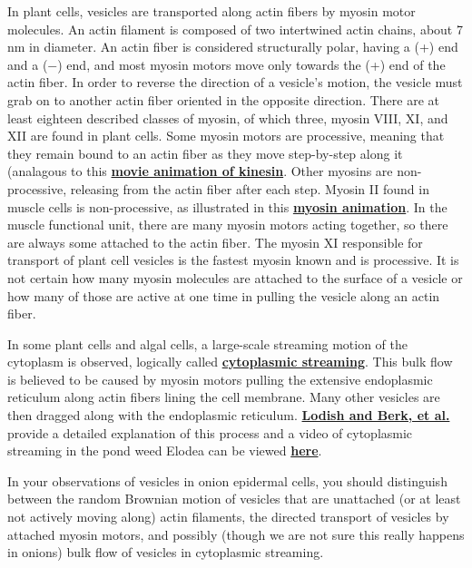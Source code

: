 \documentclass{../lab}
\begin{document}
In plant cells, vesicles are transported along actin fibers by myosin motor molecules. An actin filament is composed of two intertwined actin chains, about 7 nm in diameter. An actin fiber is considered structurally polar, having a (+) end and a ($-$) end, and most myosin motors move only towards the (+) end of the actin fiber. In order to reverse the direction of a vesicle's motion, the vesicle must grab on to another actin fiber oriented in the opposite direction. There are at least eighteen described classes of myosin, of which three, myosin VIII, XI, and XII are found in plant cells. Some myosin motors are processive, meaning that they remain bound to an actin fiber as they move step-by-step along it (analagous to this \href{http://experimentationlab.berkeley.edu/sites/default/files/motionbykinesin.mp4}{\textbf{movie animation of kinesin}}. Other myosins are non-processive, releasing from the actin fiber after each step. Myosin II found in muscle cells is non-processive, as illustrated in this \href{http://physics111.lib.berkeley.edu/Physics111/Reprints/OTZ/actinmyosin.gif}{\textbf{myosin animation}}. In the muscle functional unit, there are many myosin motors acting together, so there are always some attached to the actin fiber. The myosin XI responsible for transport of plant cell vesicles is the fastest myosin known and is processive. It is not certain how many myosin molecules are attached to the surface of a vesicle or how many of those are active at one time in pulling the vesicle along an actin fiber.

In some plant cells and algal cells, a large-scale streaming motion of the cytoplasm is observed, logically called \href{http://physics111.lib.berkeley.edu/Physics111/Reprints/OTZ/biowikipedia.pdf}{\textbf{cytoplasmic streaming}}. This bulk flow is believed to be caused by myosin motors pulling the extensive endoplasmic reticulum along actin fibers lining the cell membrane. Many other vesicles are then dragged along with the endoplasmic reticulum. \href{http://physics111.lib.berkeley.edu/Physics111/Reprints/OTZ/Cytoplasmicstreaming.pdf}{\textbf{Lodish and Berk, et al.}} provide a detailed explanation of this process and a video of cytoplasmic streaming in the pond weed Elodea can be viewed \href{http://physics111.lib.berkeley.edu/Physics111/Reprints/OTZ/cytoplasmicstreaming.avi}{\textbf{here}}.

In your observations of vesicles in onion epidermal cells, you should distinguish between the random Brownian motion of vesicles that are unattached (or at least not actively moving along) actin filaments, the directed transport of vesicles by attached myosin motors, and possibly (though we are not sure this really happens in onions) bulk flow of vesicles in cytoplasmic streaming.
\end{document}
